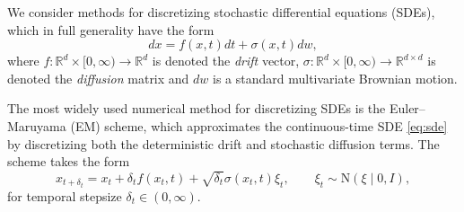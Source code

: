 \documentclass[pra,showpacs,amsmath,amssymb,amsfonts,lengthcheck,longbibliography,onecolumn]{revtex4-2}
\begin{document}
We consider methods for discretizing stochastic differential equations (SDEs), which in full generality have the form
\begin{equation}\label{eq:sde}
    dx = f(x, t) dt + \sigma(x, t) dw,
\end{equation}
where $f: \mathbb{R}^d \times [0, \infty) \to \mathbb{R}^d$ is denoted the \textit{drift}
vector, $\sigma: \mathbb{R}^d \times [0, \infty) \to \mathbb{R}^{d \times d}$ is
denoted the \textit{diffusion} matrix and $dw$ is a standard multivariate Brownian motion.

The most widely used numerical method for discretizing SDEs is the Euler–Maruyama (EM) scheme,
which approximates the continuous-time SDE \eqref{eq:sde} by discretizing both the
deterministic drift and stochastic diffusion terms. The scheme takes the form
\begin{equation}\label{eq:euler-maruyama}
    x_{t+\delta_t} = x_t + \delta_t f(x_t, t) + \sqrt{\delta_t} \sigma(x_t, t) \xi_t,
    \qquad \xi_t \sim \mathrm{N}(\xi \mid 0, I),
\end{equation}
for temporal stepsize $\delta_t \in (0, \infty)$.
\end{document}

